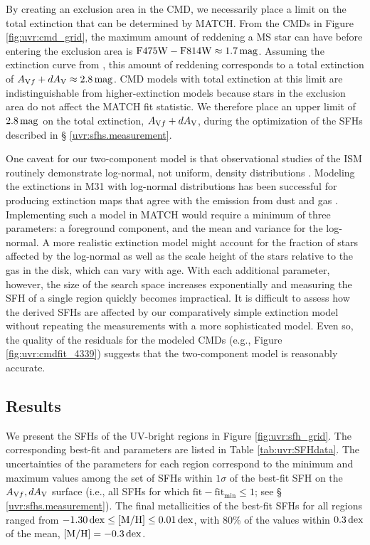By creating an exclusion area in the CMD, we necessarily place a limit on the
total extinction that can be determined by MATCH. From the CMDs in Figure
\ref{fig:uvr:cmd_grid}, the maximum amount of reddening a MS star can have before
entering the exclusion area is $\mathrm{F475W} - \mathrm{F814W} \approx
1.7\,\mathrm{mag}$. Assuming the extinction curve from \citet[][see \S
\ref{uvr:discussion.fuv}]{Cardelli:1989}, this amount of reddening corresponds to a
total extinction of $A_{\mathrm{V}f} + dA_\mathrm{V} \approx
2.8\,\mathrm{mag}$. CMD models with total extinction at this limit are
indistinguishable from higher-extinction models because stars in the exclusion
area do not affect the MATCH fit statistic. We therefore place an upper limit
of $2.8\,\mathrm{mag}$ on the total extinction, $A_{\mathrm{V}f} +
dA_\mathrm{V}$, during the optimization of the SFHs described in \S
\ref{uvr:sfhs.measurement}.

One caveat for our two-component model is that observational studies of the ISM
routinely demonstrate log-normal, not uniform, density distributions
\citep[e.g.,][]{Berkhuijsen:2008, Hill:2008, Ballesteros-Paredes:2011, Shetty:2011, Dalcanton:2014}.
Modeling the extinctions in M31 with log-normal distributions has been
successful for producing extinction maps that agree with the emission from dust
and gas \citep{Dalcanton:2014}. Implementing such a model in MATCH would require a
minimum of three parameters: a foreground component, and the mean and variance
for the log-normal. A more realistic extinction model might account for the
fraction of stars affected by the log-normal as well as the scale height of the
stars relative to the gas in the disk, which can vary with age. With each
additional parameter, however, the size of the search space increases
exponentially and measuring the SFH of a single region quickly becomes
impractical. It is difficult to assess how the derived SFHs are affected by our
comparatively simple extinction model without repeating the measurements with a
more sophisticated model. Even so, the quality of the residuals for the modeled
CMDs (e.g., Figure \ref{fig:uvr:cmdfit_4339}) suggests that the two-component model
is reasonably accurate.



\subsection{Results}\label{uvr:sfhs.results}

We present the SFHs of the UV-bright regions in Figure \ref{fig:uvr:sfh_grid}. The
corresponding best-fit \avf{} and \dav{} parameters are
listed in Table \ref{tab:uvr:SFHdata}. The uncertainties of the parameters for each
region correspond to the minimum and maximum values among the set of SFHs
within $1\sigma$ of the best-fit SFH on the $A_{\mathrm{V}f},dA_\mathrm{V}$
surface (i.e., all SFHs for which $\mathrm{fit-fit_{min}} \le 1$; see \S
\ref{uvr:sfhs.measurement}). The final metallicities of the best-fit SFHs for all
regions ranged from $-1.30\,\mathrm{dex} \le \mathrm{[M/H]} \le
0.01\,\mathrm{dex}$, with 80\% of the values within $0.3\,\mathrm{dex}$ of the
mean, $\mathrm{[M/H]} = -0.3\,\mathrm{dex}$.

